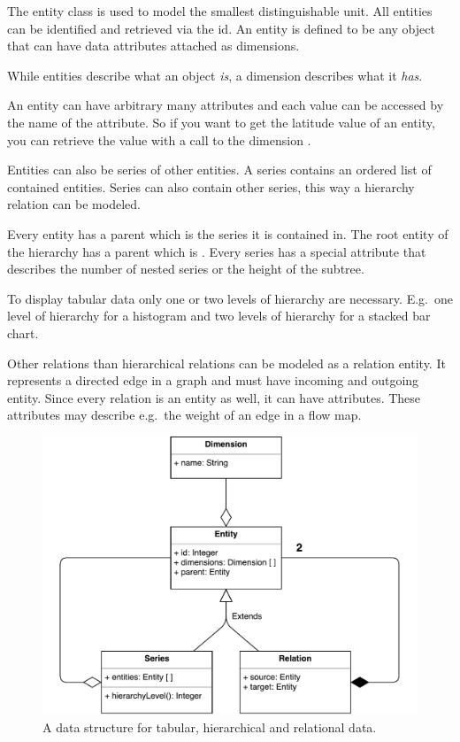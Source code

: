 The entity class is used to model the smallest distinguishable unit.
All entities can be identified and retrieved via the id.
An entity is defined to be any object that can have data attributes attached as dimensions.

While entities describe what an object \emph{is}, a dimension describes what it \emph{has}.

An entity can have arbitrary many attributes and each value can be accessed by the name of the attribute.
So if you want to get the latitude value of an entity, you can retrieve the value with a call to the dimension .

Entities can also be series of other entities.
A series contains an ordered list of contained entities.
Series can also contain other series, this way a hierarchy relation can be modeled.

Every entity has a parent which is the series it is contained in.
The root entity of the hierarchy has a parent which is .
Every series has a special attribute  that describes the number of nested series or the height of the subtree.

To display tabular data only one or two levels of hierarchy are necessary.
E.g.\ one level of hierarchy for a histogram and two levels of hierarchy for a stacked bar chart.

Other relations than hierarchical relations can be modeled as a relation entity.
It represents a directed edge in a graph and must have incoming and outgoing entity.
Since every relation is an entity as well, it can have attributes.
These attributes may describe e.g.\ the weight of an edge in a flow map.

\begin{figure}[ht]
  \centering
  \includegraphics[width=\textwidth]{figures/concept/DataModel}
  \caption{%
    A data structure for tabular, hierarchical and relational data.
  }\label{fig:concept:shared-data-model}
\end{figure}



